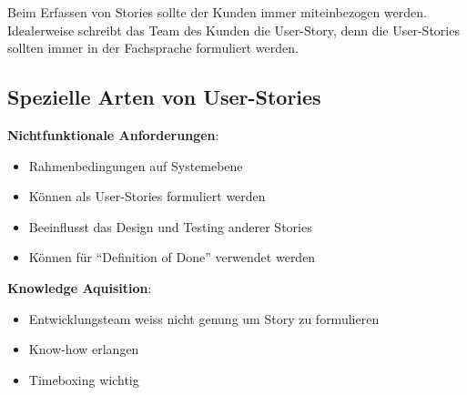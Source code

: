 \documentclass{report}
\theoremstyle{definition}
\theoremstyle{example}
\begin{document}
Beim Erfassen von Stories sollte der Kunden immer miteinbezogen werden. Idealerweise schreibt das Team des Kunden die User-Story, denn die User-Stories sollten immer in der Fachsprache formuliert werden.

\subsection{Spezielle Arten von User-Stories}
\textbf{Nichtfunktionale Anforderungen}:
\begin{itemize}
	\item Rahmenbedingungen auf Systemebene
	\item Können als User-Stories formuliert werden
	\item Beeinflusst das Design und Testing anderer Stories
	\item Können für ``Definition of Done'' verwendet werden
\end{itemize}

\textbf{Knowledge Aquisition}:
\begin{itemize}
	\item Entwicklungsteam weiss nicht genung um Story zu formulieren
	\item Know-how erlangen
	\item Timeboxing wichtig
\end{itemize}
\end{document}
